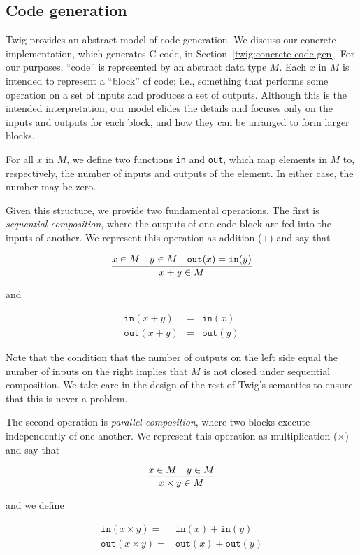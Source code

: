 
\subsection{Code generation}
\label{twig:code-gen}

Twig provides an abstract model of code generation. We discuss our concrete
implementation, which generates C code, in
Section~\ref{twig:concrete-code-gen}. For our purposes, ``code'' is
represented by an abstract data type $M$. Each $x$ in $M$ is intended to
represent a ``block'' of code; i.e., something that performs some operation on
a set of inputs and produces a set of outputs. Although this is the intended
interpretation, our model elides the details and focuses only on the inputs
and outputs for each block, and how they can be arranged to form larger
blocks.

For all $x$ in $M$, we define two functions \texttt{in} and \texttt{out},
which map elements in $M$ to, respectively, the number of inputs and outputs
of the element. In either case, the number may be zero.

Given this structure, we provide two fundamental operations. The first is
\emph{sequential composition}, where the outputs of one code block are fed
into the inputs of another. We represent this operation as addition ($+$) and
say that

\[
\infer
{x+y \in M}
{x \in M \quad y \in M \quad \mathtt{out}(x) = \mathtt{in}(y)}
\]

and

\begin{eqnarray*}
\mathtt{in} (x+y) &=& \mathtt{in}(x)\\
\mathtt{out}(x+y) &=& \mathtt{out}(y)
\end{eqnarray*}

Note that the condition that the number of outputs on the left side equal the
number of inputs on the right implies that $M$ is not closed under sequential
composition. We take care in the design of the rest of Twig's semantics to
ensure that this is never a problem.

The second operation is \emph{parallel composition}, where two blocks execute
independently of one another. We represent this operation as multiplication
($\times$) and say that

\[
\infer
{x \times y \in M}
{x \in M \quad y \in M}
\]

and we define

\begin{eqnarray*}
\mathtt{in} (x \times y) =& \mathtt{in}(x)  + \mathtt{in}(y)\\
\mathtt{out}(x \times y) =& \mathtt{out}(x) + \mathtt{out}(y)
\end{eqnarray*}


